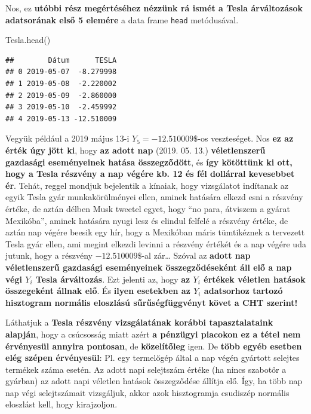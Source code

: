 \documentclass[
]{book}
\newenvironment{Shaded}{\begin{snugshade}}{\end{snugshade}}
\newcommand{\NormalTok}[1]{#1}
\begin{document}
Nos, ez \textbf{utóbbi rész megértéséhez nézzünk rá ismét a Tesla árváltozások adatsorának első 5 elemére} a data frame \texttt{head} metódusával.

\begin{Shaded}
\begin{Highlighting}[]
\NormalTok{Tesla.head()}
\end{Highlighting}
\end{Shaded}

\begin{verbatim}
##        Dátum      TESLA
## 0 2019-05-07  -8.279998
## 1 2019-05-08  -2.220002
## 2 2019-05-09  -2.860000
## 3 2019-05-10  -2.459992
## 4 2019-05-13 -12.510009
\end{verbatim}

Vegyük például a 2019 május 13-i \(Y_5=-12.510009\$\)-os veszteséget. Nos \textbf{ez az érték úgy jött ki}, hogy \textbf{az adott nap} (2019. 05. 13.) \textbf{véletlenszerű gazdasági eseményeinek hatása összegződött}, és \textbf{így kötöttünk ki ott, hogy a Tesla részvény a nap végére kb. 12 és fél dollárral kevesebbet ér}. Tehát, reggel mondjuk bejelentik a kínaiak, hogy vizsgálatot indítanak az egyik Tesla gyár munkakörülményei ellen, aminek hatására elkezd esni a részvény értéke, de aztán délben Musk tweetel egyet, hogy ``no para, átviszem a gyárat Mexikóba'', aminek hatására nyugi lesz és elindul felfelé a részvény értéke, de aztán nap végére beesik egy hír, hogy a Mexikóban máris tümtikéznek a tervezett Tesla gyár ellen, ami megint elkezdi levinni a részvény értékét és a nap végére uda jutunk, hogy a részvény \(-12.510009\$\)-al zár\ldots{}
Szóval az \textbf{adott nap véletlenszerű gazdasági eseményeinek összegződéseként áll elő a nap végi \(Y_i\) Tesla árváltozás}. Ezt jelenti az, hogy \textbf{az \(Y_i\) értékek véletlen hatások összegeként állnak elő}. És \textbf{ilyen esetekben az \(Y_i\) adatsorhoz tartozó hisztogram normális eloszlású sűrűségfüggvényt követ a CHT szerint!}

Láthatjuk a \textbf{Tesla részvény vizsgálatának korábbi tapasztalataink alapján}, hogy a csúcsosság miatt azért \textbf{a pénzügyi piacokon ez a tétel nem érvényesül annyira pontosan}, de \textbf{közelítőleg} igen. De \textbf{több egyéb esetben elég szépen érvényesül}: Pl. egy termelőgép által a nap végén gyártott selejtes termékek száma esetén. Az adott napi selejtszám értéke (ha nincs szabotőr a gyárban) az adott napi véletlen hatások összegződése állítja elő. Így, ha több nap nap végi selejtszámait vizsgáljuk, akkor azok hisztogramja csudiszép normális eloszlást kell, hogy kirajzoljon.
\end{document}
